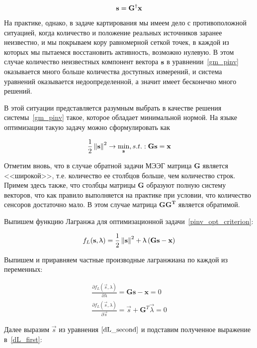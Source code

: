 \begin{equation*}
    \mathbf{s} = \mathbf{G}^\dagger\mathbf{x}
\end{equation*}

На практике, однако, в задаче картирования мы имеем дело с противоположной ситуацией,
когда количество и положение реальных источников заранее неизвестно, и мы
покрываем кору равномерной сеткой точек, в каждой из которых мы пытаемся восстановить активность,
возможно нулевую. В этом случае количество неизвестных компонент вектора $\mathbf{s}$ в уравнении~\ref{gm_pinv}
оказывается много больше количества доступных измерений,
и система уравнений оказывается недоопределенной, а значит имеет бесконечно много решений.

В этой ситуации представляется разумным выбрать в качестве решения системы~\ref{gm_pinv}
такое, которое обладает минимальной нормой.
На языке оптимизации такую задачу можно сформулировать как

\begin{equation}
    \frac{1}{2}\left\lVert\mathbf{s}\right\rVert^2 \rightarrow \underset{\mathbf{s}}{\min},
    s.t.: \mathbf{G} \mathbf{s} = \mathbf{x}
    \label{pinv_opt_criterion}
\end{equation}

Отметим вновь, что в случае обратной задачи МЭЭГ матрица $\mathbf{G}$ является
<<широкой>>, т.е.  количество ее столбцов больше, чем количество строк. Примем
здесь также, что столбцы матрицы $\mathbf{G}$ образуют полную систему векторов,
что как правило выполняется на практике при условии, что количество сенсоров
достаточно мало. В этом случае матрица $\mathbf{GG^T}$ является обратимой.

Выпишем функцию Лагранжа для оптимизационной задачи~\ref{pinv_opt_criterion}:

\begin{equation}
    f_L(\mathbf{s}, \uplambda) = \frac{1}{2}\left\lVert\mathbf{s}\right\rVert^2 + \uplambda \left(\mathbf{Gs - x}\right)
\end{equation}

Выпишем и приравняем частные производные лагранжиана по каждой из переменных:

\begin{gather}
    \frac{\partial f_L(\vec{s}, \lambda)}{\partial \lambda} = \mathbf{Gs - x} = 0
    \label{dL_first} \\
    \frac{\partial f_L(\vec{s}, \lambda)}{\partial \vec{s}} = \vec{s}
    + \mathbf{G}^T\vec{\lambda} = 0
    \label{dL_second}
\end{gather}

Далее выразим $\vec{s}$ из уравнения $\ref{dL_second}$ и подставим
полученное выражение в~\ref{dL_first}:

